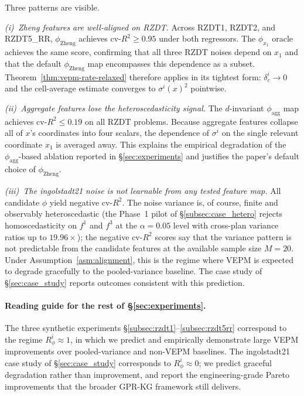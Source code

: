 Three patterns are visible.

\emph{(i)~Zheng features are well-aligned on RZDT.}  Across RZDT1, RZDT2,
and RZDT5\_RR, $\phi_{\mathrm{Zheng}}$ achieves cv-$R^{2}\ge 0.95$ under
both regressors.  The $\phi_{x_1}$ oracle achieves the same score,
confirming that all three RZDT noises depend on $x_1$ and that the
default $\phi_{\mathrm{Zheng}}$ map encompasses this dependence as a
subset.  Theorem~\ref{thm:vepm-rate-relaxed} therefore applies in its
tightest form: $\delta_c^i\to 0$ and the cell-average estimate converges
to $\sigma^{i}(x)^{2}$ pointwise.

\emph{(ii)~Aggregate features lose the heteroscedasticity signal.}  The
$d$-invariant $\phi_{\mathrm{agg}}$ map achieves cv-$R^{2}\le 0.19$ on
all RZDT problems.  Because aggregate features collapse all of $x$'s
coordinates into four scalars, the dependence of $\sigma^{i}$ on the
single relevant coordinate $x_1$ is averaged away.  This explains the
empirical degradation of the $\phi_{\mathrm{agg}}$-based ablation
reported in \S\ref{sec:experiments} and justifies the paper's default
choice of $\phi_{\mathrm{Zheng}}$.

\emph{(iii)~The ingolstadt21 noise is not learnable from any tested
feature map.}  All candidate $\phi$ yield negative cv-$R^{2}$.
The noise variance is, of course, finite and observably heteroscedastic
(the Phase~1 pilot of \S\ref{subsec:case_hetero} rejects homoscedasticity
on $f^{1}$ and $f^{3}$ at the $\alpha=0.05$ level with cross-plan
variance ratios up to $19.96\times$); the negative cv-$R^{2}$ scores
say that the variance pattern is not predictable from the candidate
features at the available sample size $M=20$.  Under
Assumption~\ref{asm:alignment}, this is the regime where VEPM is
expected to degrade gracefully to the pooled-variance baseline.  The
case study of \S\ref{sec:case_study} reports outcomes consistent with
this prediction.

\paragraph{Reading guide for the rest of \S\ref{sec:experiments}.}
The three synthetic experiments \S\ref{subsec:rzdt1}--\ref{subsec:rzdt5rr}
correspond to the regime $R_\phi^i\approx 1$, in which we predict and
empirically demonstrate large VEPM improvements over pooled-variance and
non-VEPM baselines.  The ingolstadt21 case study of \S\ref{sec:case_study}
corresponds to $R_\phi^i\approx 0$; we predict graceful degradation
rather than improvement, and report the engineering-grade Pareto
improvements that the broader GPR-KG framework still delivers.


